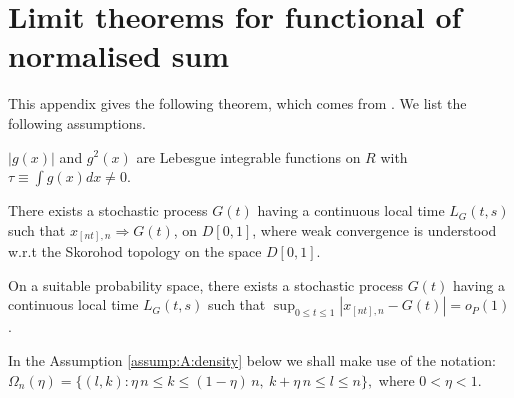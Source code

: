 \chapter{Limit theorems for functional of normalised sum} 

This appendix gives the following theorem, which comes from \cite{wangphillips2010a}. We list the following assumptions.

\begin{assump} 
$|g(x)|$ and $g^2(x)$ are Lebesgue integrable functions on $R$ with $\tau \equiv \int g(x) dx \ne 0$.
\end{assump}

\begin{assump} 
There exists a stochastic process $G(t)$ having a continuous local time $L_{G}(t,s)$ such that $x_{[nt],n}\Rightarrow G(t)$, on $D[0,1]$, where weak convergence is understood w.r.t the Skorohod topology on the space $D[0,1]$.
\end{assump}

\newenvironment{assump_1}{ \par \medskip\noindent  {\bf Assumption \ref{assump:A:weakConvergence}*.}}{\par\medskip}

\begin{assump_1} 
On a suitable probability space, there exists a stochastic process $G(t)$ having a continuous local time $L_G(t, s)$ such that $\sup_{0 \le t \le 1} | x_{[nt], n} - G(t) | = o_P(1)$.
\end{assump_1}

In the Assumption \ref{assump:A:density} below we shall make use of the notation: $ \Omega_n(\eta)=\big\{(l,k): \eta\, n\le k\le (1-\eta)\, n,\ k+\eta \, n\le l\le n \big\},$ where $0<\eta<1$.

